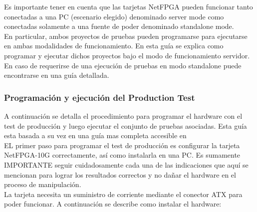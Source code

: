 Es importante tener en cuenta que las tarjetas NetFPGA pueden funcionar tanto conectadas a una PC 
 (escenario elegido) denominado server mode como conectadas solamente a una fuente de poder denominado standalone mode.\\

En particular, ambos proyectos de pruebas pueden programarse para ejecutarse en ambas modalidades de funcionamiento. En esta guía se explica como programar y ejecutar dichos proyectos bajo el modo de funcionamiento servidor. En caso de requerirse de una ejecuci\'on de pruebas en modo standalone puede encontrarse en\citep{NetFPGA6}\citep{NetFPGA8} una guía detallada.

\subsubsection{Programación y ejecución del Production Test}
A continuación se detalla el procedimiento para programar el hardware con el test de producción y luego ejecutar el conjunto de pruebas asociadas. Esta guía esta basada a su vez en una guía mas completa accesible en\citep{NetFPGA6}\\

EL primer paso para programar el test de producción es configurar la tarjeta NetFPGA-10G correctamente, así como instalarla en una PC. Es sumamente IMPORTANTE seguir cuidadosamente cada una de las indicaciones que aquí se mencionan para lograr los resultados correctos y no dañar el hardware en el proceso de manipulación.\\ 

La tarjeta necesita un suministro de corriente mediante el conector ATX para poder funcionar. A continuación se describe como instalar el hardware:

